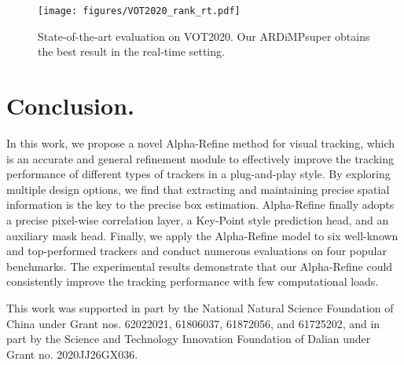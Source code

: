 \documentclass[final]{cvpr}
\begin{document}
\begin{figure}[htbp]
\centering
\texttt{[image: figures/VOT2020\_rank\_rt.pdf]}
    \caption{State-of-the-art evaluation on VOT2020. Our ARDiMPsuper obtains the best result in the real-time setting. 
} \label{fig:vot2020-rank-rt}

\end{figure}



\section{Conclusion.}
In this work, we propose a novel Alpha-Refine method for visual tracking, which is an accurate and general 
refinement module to effectively improve the tracking performance of different types of trackers in a plug-and-play style. 
By exploring multiple design options, we find that extracting and maintaining precise spatial information is the key to the precise box estimation. Alpha-Refine finally adopts a precise pixel-wise correlation layer, a Key-Point style prediction head, 
and an auxiliary mask head. Finally, we apply the Alpha-Refine model to six well-known and top-performed trackers and conduct 
numerous evaluations on four popular benchmarks. The experimental results demonstrate that our Alpha-Refine could consistently 
improve the tracking performance with few computational loads.
\vspace{4mm}


This work was supported in part by the National Natural Science Foundation of China 
under Grant nos. 62022021, 61806037, 61872056, and 61725202, and in part by the Science and Technology Innovation 
Foundation of Dalian under Grant no. 2020JJ26GX036.

\clearpage
{\small


}
\end{document}
